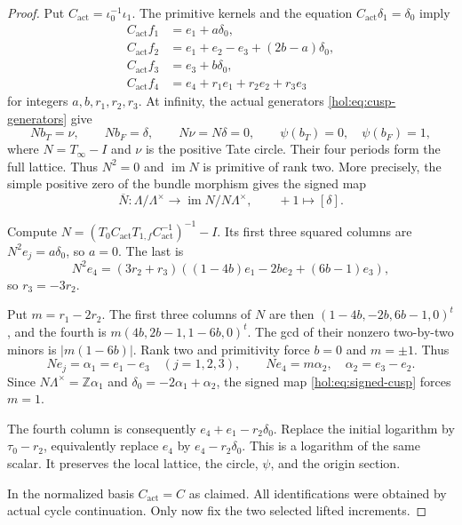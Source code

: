 \documentclass[11pt]{article}
\numberwithin{equation}{section}
\begin{document}
\begin{proof}
Put $C_{\mathrm{act}}=\iota_0^{-1}\iota_1$. The primitive kernels
and the equation $C_{\mathrm{act}}\delta_1=\delta_0$ imply
\begin{align*}
 C_{\mathrm{act}}f_1&=e_1+a\delta_0,\\
 C_{\mathrm{act}}f_2&=e_1+e_2-e_3+(2b-a)\delta_0,\\
 C_{\mathrm{act}}f_3&=e_3+b\delta_0,\\
 C_{\mathrm{act}}f_4&=e_4+r_1e_1+r_2e_2+r_3e_3
\end{align*}
for integers $a,b,r_1,r_2,r_3$. At infinity, the actual generators
\eqref{hol:eq:cusp-generators} give
\[
 Nb_T=\nu,\qquad Nb_F=\delta,\qquad N\nu=N\delta=0,
 \qquad\psi(b_T)=0,\quad\psi(b_F)=1,
\]
where $N=T_\infty-I$ and $\nu$ is the positive Tate circle.
Their four periods form the full lattice. Thus $N^2=0$ and
$\operatorname{im}N$ is primitive of rank two. More precisely,
the simple positive zero of the bundle morphism gives the signed map
\begin{equation}\label{hol:eq:signed-cusp}
 \overline N:\Lambda/\Lambda^\times\longrightarrow
 \operatorname{im}N/N\Lambda^\times,
 \qquad +1\longmapsto[\delta].
\end{equation}

Compute $N=(T_0C_{\mathrm{act}}T_{1,f}C_{\mathrm{act}}^{-1})^{-1}-I$.
Its first three squared columns are $N^2e_j=a\delta_0$, so $a=0$.
The last is
\[
 N^2e_4=(3r_2+r_3)
       ((1-4b)e_1-2be_2+(6b-1)e_3),
\]
so $r_3=-3r_2$.

Put $m=r_1-2r_2$. The first three columns of $N$
are then $(1-4b,-2b,6b-1,0)^t$, and the fourth is
$m(4b,2b-1,1-6b,0)^t$. The gcd of their nonzero two-by-two minors
is $|m(1-6b)|$. Rank two and primitivity force $b=0$ and $m=\pm1$.
Thus
\[
 Ne_j=\alpha_1=e_1-e_3\quad(j=1,2,3),\qquad
 Ne_4=m\alpha_2,
 \quad\alpha_2=e_3-e_2.
\]
Since $N\Lambda^\times=\mathbb Z\alpha_1$ and
$\delta_0=-2\alpha_1+\alpha_2$, the signed map
\eqref{hol:eq:signed-cusp} forces $m=1$.

The fourth column is consequently $e_4+e_1-r_2\delta_0$.
Replace the initial logarithm by $\tau_0-r_2$, equivalently replace
$e_4$ by $e_4-r_2\delta_0$. This is a logarithm of the same scalar.
It preserves the local lattice, the circle, $\psi$, and the origin
section.

In the normalized basis $C_{\mathrm{act}}=C$ as claimed.
All identifications were obtained by actual cycle continuation.
Only now fix the two selected lifted increments.
\end{proof}
\end{document}

